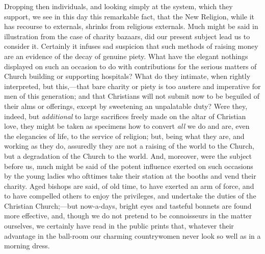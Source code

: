 Dropping
then individuals, and looking simply at the system, which they support,
we see in this day this remarkable fact, that the New Religion, while it
has recourse to externals, shrinks from religious externals. Much might
be said in illustration from the case of charity bazaars, did our
present subject lead us to consider it. Certainly it infuses sad
suspicion that such methods of raising money are an evidence of the
decay of genuine piety. What have the elegant nothings displayed on such
an occasion to do with contributions for the serious matters of Church
building or supporting hospitals? What do they intimate, when rightly
interpreted, but this,—that bare charity or piety is too austere and
imperative for men of this generation; and that Christians will not
submit now to be beguiled of their alms or offerings, except by
sweetening an unpalatable duty? Were they, indeed, but \emph{additional}
to large sacrifices freely made on the altar of Christian love, they
might be taken as specimens how to convert \emph{all} we do and are,
even the elegancies of life, to the service of religion; but, being what
they are, and working as they do, assuredly they are not a raising of
the world to the Church, but a degradation of the Church to the world.
And, moreover, were the subject before us, much might be said of the
potent influence exerted on such occasions by the young ladies who
ofttimes take their station at the booths and vend their charity. Aged
bishops are said, of old time, to have exerted an arm of force, and to
have compelled others to enjoy the privileges, and undertake the duties
of the Christian Church;—but now-a-days, bright eyes and tasteful
bonnets are found more effective, and, though we do not pretend to be
connoisseurs in the matter ourselves, we certainly have read in the
public prints that, whatever their advantage in the ball-room our
charming countrywomen never look so well as in a morning dress.

